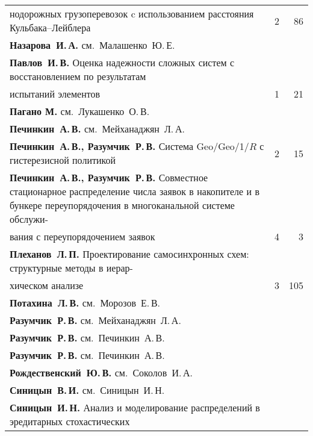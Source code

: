 {\begin{tabular}{p{388pt}rr}
\hspace*{23pt}нодорожных грузоперевозок c использованием расстояния Кульбака--Лейблера %
&2&86\\
\textbf{Назарова~И.\,А.} см.\ Малашенко~Ю.\,Е.&&\\
\textbf{Павлов~И.\,В.} Оценка надежности сложных систем с восстановлением по
результатам\linebreak
\vspace*{-12pt}\\
\hspace*{23pt}испытаний элементов\dotfill&1&21\\
\textbf{Пагано М.} см.\ Лукашенко~О.\,В.&&\\
\textbf{Печинкин~А.\,В.} см.\ Мейханаджян~Л.\,А.&&\\
\textbf{Печинкин~А.\,В., Разумчик~Р.\,В.} Система Geo/Geo/1/$R$ с гистерезисной
политикой\dotfill&2&15\\
\hangindent=23pt\noindent\textbf{Печинкин~А.\,В., Разумчик~Р.\,В.} Совместное стационарное распределение числа
заявок в накопителе и в бункере переупорядочения в многоканальной системе
об\-слу\-жи-\linebreak
\vspace*{-12pt}\\
\hspace*{23pt}ва\-ния с переупорядочением заявок\dotfill&4&3\\
\textbf{Плеханов~Л.\,П.} Проектирование самосинхронных схем: структурные методы в
иерар-\linebreak
\vspace*{-12pt}\\
\hspace*{23pt}хическом анализе\dotfill&3&105\\
\textbf{Потахина~Л.\,В.} см.\ Морозов~Е.\,В.&&\\
\textbf{Разумчик~Р.\,В.} см.\ Мейханаджян~Л.\,А.&&\\
\textbf{Разумчик~Р.\,В.} см.\ Печинкин~А.\,В.&&\\
\textbf{Разумчик~Р.\,В.} см.\ Печинкин~А.\,В.&&\\
\textbf{Рождественский~Ю.\,В.} см.\ Соколов~И.\,А.&&\\
\textbf{Синицын~В.\,И.} см.\ Синицын~И.\,Н.&&\\
\textbf{Синицын~И.\,Н.} Анализ и моделирование распределений в эредитарных
стохастических\linebreak
\vspace*{-12pt}\\

\end{tabular}}
